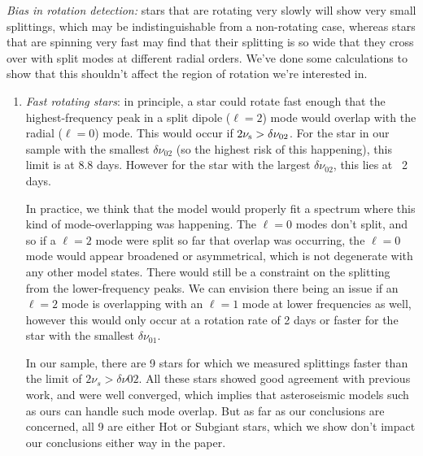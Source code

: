 \documentclass[11pt]{article}
\begin{document}
\textit{Bias in rotation detection:} stars that are rotating very slowly will show very small splittings, which may be indistinguishable from a non-rotating case, whereas stars that are spinning very fast may find that their splitting is so wide that they cross over with split modes at different radial orders. We’ve done some calculations to show that this shouldn’t affect the region of rotation we’re interested in.
\begin{enumerate}
\item \textit{Fast rotating stars}: in principle, a star could rotate fast enough that the highest-frequency peak in a split dipole ($\ell=2$) mode would overlap with the radial ($\ell=0$) mode. This would occur if $2\nu_{\rm{s}} > \delta\nu_{02}$. For the star in our sample with the smallest $\delta\nu_{02}$ (so the highest risk of this happening), this limit is at 8.8 days. However for the star with the largest $\delta\nu_{02}$, this lies at ~2 days. 

In practice, we think that the model would properly fit a spectrum where this kind of mode-overlapping was happening. The $\ell=0$ modes don’t split, and so if a $\ell=2$ mode were split so far that overlap was occurring, the $\ell=0$ mode would appear broadened or asymmetrical, which is not degenerate with any other model states. There would still be a constraint on the splitting from the lower-frequency peaks. We can envision there being an issue if an $\ell=2$ mode is overlapping with an $\ell=1$ mode at lower frequencies as well, however this would only occur at a rotation rate of 2 days or faster for the star with the smallest $\delta\nu_{01}$.
 
In our sample, there are 9 stars for which we measured splittings faster than the limit of $2\nu_s > \delta\nu{02}$. All these stars showed good agreement with previous work, and were well converged, which implies that asteroseismic models such as ours can handle such mode overlap. But as far as our conclusions are concerned, all 9 are either Hot or Subgiant stars, which we show don’t impact our conclusions either way in the paper.


\end{enumerate}
\end{document}
